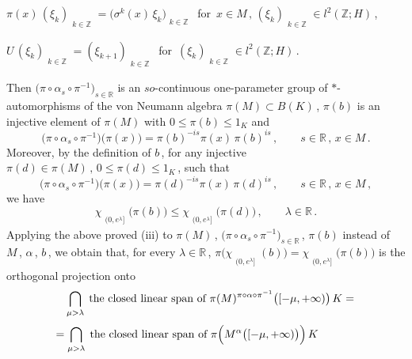 \documentclass[reqno]{amsart}
\theoremstyle{definition}
\theoremstyle{remark}
\numberwithin{equation}{section}
\theoremstyle{plain}
\begin{document}
\noindent \hspace{0.25 in} $\pi (x)\,
(\xi_k)_{\substack{{}\\{k\in\mathbb Z}}} =
\big( \sigma^k (x)\,\xi_k\big)_{\substack{{}\\{k\in\mathbb Z}}}\,$
for $\, x\in M\, ,\, (\xi_k)_{\substack{{}\\{k\in\mathbb Z}}}\in
l^2(\mathbb Z ; H)\,$,

\noindent \hspace{0.25 in} $U\,
(\xi_k)_{\substack{{}\\{k\in\mathbb Z}}} =
(\xi_{k+1})_{\substack{{}\\{k\in\mathbb Z}}}\,$ for
$\, (\xi_k)_{\substack{{}\\{k\in\mathbb Z}}}\in
l^2(\mathbb Z ; H)\,$.
\smallskip

\noindent Then $\big(\pi\circ\alpha_s\circ\pi^{-1}
\big)_{s\in\mathbb R}$ is an $so$-continuous one-parameter group
of $*$-automorphisms of the von Neumann algebra
$\pi (M)\subset B(K)\,$, $\pi (b)$ is an injective element of
$\pi (M)$ with $0\leq\pi (b)\leq 1_K$ and
\begin{equation*}
\big(\pi\circ\alpha_s\circ\pi^{-1}\big) \big(\pi (x)\big) =
\pi (b)^{-is}\pi (x)\,\pi (b)^{is}\, ,\qquad s\in\mathbb R\, ,\,
x\in M\, .
\end{equation*}
Moreover, by the definition of $b\,$, for any injective
$\pi (d)\in\pi (M)\, ,\, 0\leq\pi (d)\leq 1_K\,$, such that
\begin{equation*}
\big(\pi\circ\alpha_s\circ\pi^{-1}\big) \big(\pi (x)\big) =
\pi (d)^{-is}\pi (x)\,\pi (d)^{is}\, ,\qquad s\in\mathbb R\, ,\,
x\in M\, ,
\end{equation*}
we have
\begin{equation*}
\chi_{\substack{{}\\{(0,e^\lambda ]}}} \big(\pi (b)\big)
\leq\chi_{\substack{{}\\{(0,e^\lambda ]}}} \big(\pi (d)\big)\,
,\qquad \lambda\in\mathbb R\, .
\end{equation*}
Applying the above proved (iii) to $\pi (M)\,$, $\big(\pi\circ
\alpha_s\circ\pi^{-1}\big)_{s\in\mathbb R}\,$, $\pi (b)$
instead of $M\,$, $\alpha\,$, $b\,$, we
obtain that, for every $\lambda\in\mathbb R\,$,
$\pi\big( \chi_{\substack{{}\\{(0,e^\lambda ]}}} (b)\big) =
\chi_{\substack{{}\\{(0,e^\lambda ]}}} \big(\pi (b)\big)$ is
the orthogonal projection onto
\begin{equation*} \hspace{0.3 cm}
\bigcap_{\mu >\lambda}\;\text{the closed linear span of }
\pi (M)^{\pi\circ\alpha\circ\pi^{-1}}\big( [-\mu ,+\infty )\big)
\, K =
\end{equation*}
\begin{equation*}
= \bigcap_{\mu >\lambda}\;\text{the closed linear span of }
\pi \Big( M^\alpha \big( [-\mu ,+\infty )\big)\Big)\, K
\hspace{1.2 cm}
\end{equation*}
\end{document}
